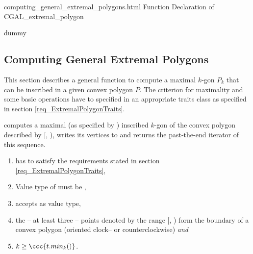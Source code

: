 \begin{ccAdvanced}
  \ccHtmlNoClassToc
  \begin{ccHtmlClassFile}{computing_general_extremal_polygons.html}
    {Function Declaration of CGAL_extremal_polygon}
    \ccHtmlNoClassIndex\ccHtmlNoClassLinks
    \begin{ccClass}{dummy}
      \ccHtmlNoIndex\subsection{Computing General Extremal
        Polygons}\label{secGeneralExtremalPolygons}
    \end{ccClass}
    
    This section describes a general function to compute a maximal
    $k$-gon $P_k$ that can be inscribed in a given convex polygon $P$.
    The criterion for maximality and some basic operations have to
    specified in an appropriate traits class as specified in section
    \ref{req_ExtremalPolygonTraits}.
    

    \def\ccLongParamLayout{\ccTrue} 
    
    
    computes a maximal (as specified by ) inscribed $k$-gon of
    the convex polygon described by [,
    ), writes its vertices to  and returns the
    past-the-end iterator of this sequence.
    
    \begin{enumerate}
    \item {} has to satisfy the requirements stated in section
      \ref{req_ExtremalPolygonTraits},
    \item Value type of  must be
      ,
    \item {} accepts  as value
      type,
    \item the -- at least three -- points denoted by the range
      [, ) form the boundary of a
      convex polygon (oriented clock-- or counterclockwise) \textit{and}
    \item $k \ge \ccc{t.min_k()}$.
    \end{enumerate}
    

\end{ccHtmlClassFile}
\end{ccAdvanced}
